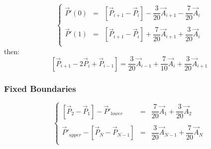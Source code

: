 \documentclass[aps,12pt]{revtex4}
\begin{document}
\begin{equation}
\left\lbrace
\begin{array}{rcl}
	\vec{P}'(0) & = & \left[\vec{P}_{i+1}-\vec{P}_i\right] - \dfrac{3}{20} \vec{A}_{i+1} - \dfrac{7}{20}\vec{A}_{i} \\
	\\
	\vec{P}'(1) & = & \left[\vec{P}_{i+1}-\vec{P}_i\right] + \dfrac{7}{20} \vec{A}_{i+1} + \dfrac{3}{20}\vec{A}_{i}\\
\end{array}
\right.
\end{equation}
then:
\begin{equation}
	 \left[\vec{P}_{i+1}-2\vec{P}_i+\vec{P}_{i-1}\right] = \dfrac{3}{20} \vec{A}_{i-1} + \dfrac{7}{10}\vec{A}_{i} + \dfrac{3}{20} \vec{A}_{i+1}
\end{equation}

\subsubsection{Fixed Boundaries}
 
\begin{equation}
\left\lbrace
\begin{array}{rcl}
 	 \left[\vec{P}_{2}-\vec{P}_1\right] - \vec{P}'_{lower}& = &\dfrac{7}{20} \vec{A}_1 + \dfrac{3}{20} \vec{A}_{2}\\
	 \\
	\vec{P}'_{upper} - \left[\vec{P}_N - \vec{P}_{N-1}\right] & = & \dfrac{3}{20} \vec{A}_{N-1} + \dfrac{7}{20} \vec{A}_{N}\\
\end{array}
\right.
\end{equation}
\end{document}
